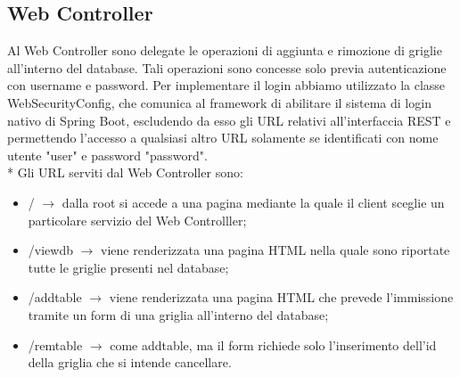 \subsection{Web Controller}
Al Web Controller sono delegate le operazioni di aggiunta e rimozione di griglie all'interno del database. Tali operazioni sono concesse solo previa autenticazione con username e password. Per implementare il login abbiamo utilizzato la classe WebSecurityConfig, che comunica al framework di abilitare il sistema di login nativo di Spring Boot, escludendo da esso gli URL relativi all'interfaccia REST e permettendo l'accesso a qualsiasi altro URL solamente se identificati con nome utente "user" e password "password".\\*
Gli URL serviti dal Web Controller sono:
\begin{itemize}
	\item / $\rightarrow$ dalla root si accede a una pagina mediante la quale il client sceglie un particolare servizio del Web Controlller;
	\item /viewdb $\rightarrow$ viene renderizzata una pagina HTML nella quale sono riportate tutte le griglie presenti nel database;
	\item /addtable $\rightarrow$ viene renderizzata una pagina HTML che prevede l'immissione tramite un form di una griglia all'interno del database;
	\item /remtable $\rightarrow$ come addtable, ma il form richiede solo l'inserimento dell'id della griglia che si intende cancellare.
\end{itemize}
